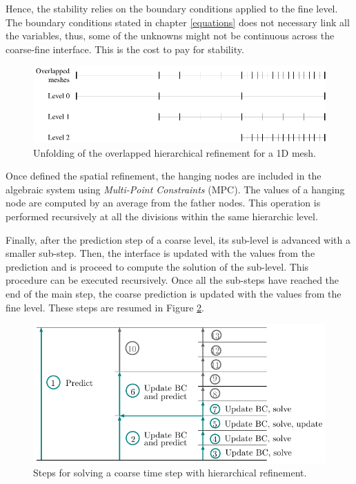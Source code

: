 Hence, the stability relies on the boundary conditions applied to the fine level. The boundary conditions stated in chapter \ref{equations} does not necessary link all the variables, thus, some of the unknowns might not be continuous across the coarse-fine interface. This is the cost to pay for stability.

\begin{figure} [htpb]
    \centering
    \includegraphics[width=\textwidth]{img/multigrid/multilevel_overlap.pdf}
    \caption{Unfolding of the overlapped hierarchical refinement for a 1D mesh.}
    \label{multilevel_overlap}
\end{figure}

Once defined the spatial refinement, the hanging nodes are included in the algebraic system using \emph{Multi-Point Constraints} (MPC). The values of a hanging node are computed by an average from the father nodes. This operation is performed recursively at all the divisions within the same hierarchic level.

Finally, after the prediction step of a coarse level, its sub-level is advanced with a smaller sub-step. Then, the interface is updated with the values from the prediction and is proceed to compute the solution of the sub-level. This procedure can be executed recursively. Once all the sub-steps have reached the end of the main step, the coarse prediction is updated with the values from the fine level. These steps are resumed in Figure \ref{multilevel_steps}.

\begin{figure} [htpb]
    \centering
    \includegraphics[width=.8\textwidth]{img/multigrid/multilevel_steps.pdf}
    \caption{Steps for solving a coarse time step with hierarchical refinement.}
    \label{multilevel_steps}
\end{figure}

